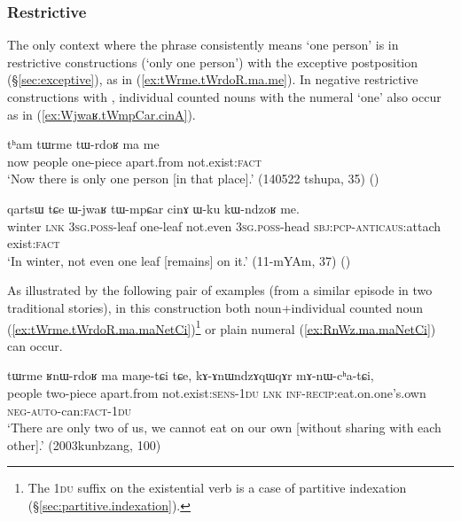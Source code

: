 \subsubsection{Restrictive} \label{sec:CN.restrictive}

The only context where the phrase  consistently means `one person' is in restrictive constructions (`only one person') with the exceptive postposition  (§\ref{sec:exceptive}), as in (\ref{ex:tWrme.tWrdoR.ma.me}).  In negative restrictive constructions with , individual counted nouns with the numeral  `one' also occur as in (\ref{ex:Wjwaʁ.tWmpCar.cinA}).

\begin{exe}
	\ex \label{ex:tWrme.tWrdoR.ma.me}
	\gll tʰam tɯrme tɯ-rdoʁ ma me \\
	now people one-piece apart.from not.exist:\textsc{fact} \\
	\glt `Now there is only one person [in that place].' (140522 tshupa, 35)
()
\end{exe} 

\begin{exe}
	\ex \label{ex:Wjwaʁ.tWmpCar.cinA}
	\gll   qartsɯ tɕe ɯ-jwaʁ tɯ-mpɕar cinɤ ɯ-ku kɯ-ndzoʁ me.  \\
	winter \textsc{lnk} \textsc{3sg}.\textsc{poss}-leaf one-leaf not.even \textsc{3sg}.\textsc{poss}-head \textsc{sbj}:\textsc{pcp}-\textsc{anticaus}:attach exist:\textsc{fact} \\ 
	\glt `In winter, not even one leaf [remains] on it.' (11-mYAm, 37)
()
\end{exe} 

As illustrated by the following pair of examples (from a similar episode in two traditional stories), in this construction both noun+individual counted noun  (\ref{ex:tWrme.tWrdoR.ma.maNetCi})\footnote{The \textsc{1du} suffix on the existential verb  is a case of partitive indexation (§\ref{sec:partitive.indexation}). }  or plain numeral (\ref{ex:RnWz.ma.maNetCi}) can occur.

\begin{exe}
	\ex \label{ex:tWrme.tWrdoR.ma.maNetCi}
	\gll tɯrme ʁnɯ-rdoʁ ma maŋe-tɕi tɕe, kɤ-ɤnɯndzɤqɯqɤr mɤ-nɯ-cʰa-tɕi, \\
	people two-piece apart.from not.exist:\textsc{sens}-\textsc{1du} \textsc{lnk} \textsc{inf}-\textsc{recip}:eat.on.one's.own \textsc{neg}-\textsc{auto}-can:\textsc{fact}-\textsc{1du} \\
	\glt `There are only two of us, we cannot eat on our own [without sharing with each other].' (2003kunbzang, 100)
\end{exe} 

